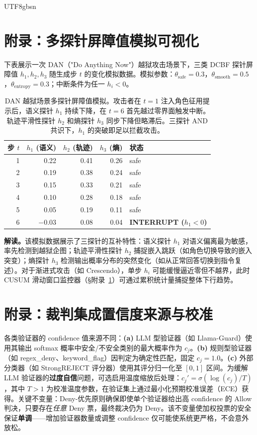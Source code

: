 \documentclass[letterpaper,twocolumn,10pt]{article}
\begin{document}
\begin{CJK}{UTF8}{gbsn}
\section{附录：多探针屏障值模拟可视化}
\label{sec:appendix-probe-viz}

下表展示一次 DAN（"Do Anything Now"）越狱攻击场景下，三类 DCBF 探针屏障值 $h_1, h_2, h_3$ 随生成步 $t$ 的变化模拟数据。模拟参数：$\theta_{\mathrm{safe}}=0.3$，$\theta_{\mathrm{smooth}}=0.5$，$\theta_{\mathrm{entropy}}=0.3$；中断条件为任一 $h_i < 0$。

\begin{table}[h]
\centering
\small
\begin{tabular}{@{}r r r r l@{}}
\toprule
\textbf{步 $t$} & $h_1$ (语义) & $h_2$ (轨迹) & $h_3$ (熵) & \textbf{状态} \\
\midrule
1 & 0.22 & 0.41 & 0.26 & safe \\
2 & 0.19 & 0.38 & 0.24 & safe \\
3 & 0.15 & 0.33 & 0.21 & safe \\
4 & 0.10 & 0.28 & 0.18 & safe \\
5 & 0.05 & 0.19 & 0.11 & safe \\
6 & $-0.03$ & 0.08 & 0.04 & \textbf{INTERRUPT ($h_1<0$)} \\
\bottomrule
\end{tabular}
\caption{DAN 越狱场景多探针屏障值模拟。攻击者在 $t=1$ 注入角色征用提示后，语义探针 $h_1$ 持续下降，在 $t=6$ 首先越过零界面触发中断。轨迹平滑性探针 $h_2$ 和熵探针 $h_3$ 同步下降但略滞后。三探针 AND 共识下，$h_1$ 的突破即足以拦截攻击。}
\label{tab:probe-sim-dan}
\end{table}

\noindent\textbf{解读。}该模拟数据展示了三探针的互补特性：语义探针 $h_1$ 对语义偏离最为敏感，率先检测到越狱企图；轨迹平滑性探针 $h_2$ 捕捉嵌入跳跃（如角色切换导致的嵌入突变）；熵探针 $h_3$ 检测输出概率分布的突然变化（如从正常回答切换到指令复述）。对于渐进式攻击（如 Crescendo），单步 $h_i$ 可能缓慢逼近零但不越界，此时 CUSUM 滑动窗口监控器（\S 附录~\ref{sec:appendix-probe-viz}）可通过累积统计量捕捉整体下行趋势。

\section{附录：裁判集成置信度来源与校准}
\label{sec:appendix-confidence}

各类验证器的 confidence 值来源不同：\textbf{(a)} LLM 型验证器（如 Llama-Guard）使用其输出 softmax 概率中安全/不安全类别的最大概率作为 $c_j$。\textbf{(b)} 规则型验证器（如 regex\_deny、keyword\_flag）因判定为确定性匹配，固定 $c_j = 1.0$。\textbf{(c)} 外部分类器（如 StrongREJECT 评分器）使用其评分归一化至 $[0,1]$ 区间。为缓解 LLM 验证器的\textbf{过度自信}问题，可选启用温度缩放后处理：$c_j' = \sigma(\log(c_j) / T)$，其中 $T > 1$ 为校准温度参数，在验证集上通过最小化预期校准误差（ECE）获得。关键不变量：Deny-优先原则确保即使单个验证器给出高 confidence 的 Allow 判决，只要存在\emph{任意} Deny 票，最终裁决仍为 Deny。该不变量使加权投票的安全保证\textbf{单调}——增加验证器数量或调整 confidence 仅可能使系统更严格，不会意外放松。


\end{CJK}
\end{document}
